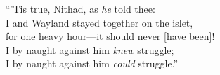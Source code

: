 \bvb{}%
“’Tis true, Nithad, as \emph{he} told thee: \\
I and Wayland stayed together on the islet, \\
for one heavy hour—it should never [have been]! \\
I by naught against him \emph{knew} struggle; \\
I by naught against him \emph{could} struggle.”\evb\evg

\sectionline
